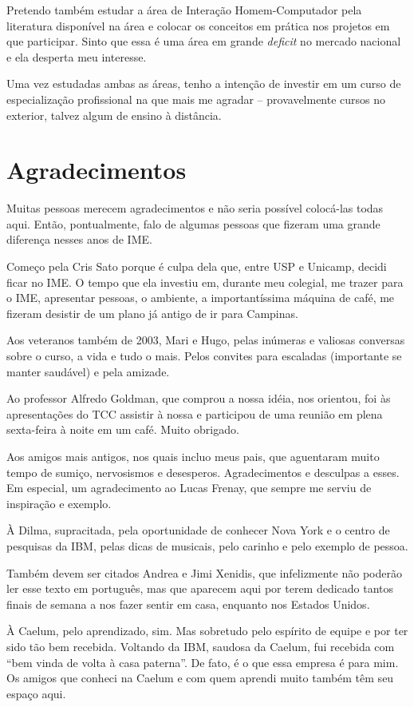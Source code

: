 \documentclass[titlepage,a4paper]{article}
\begin{document}
Pretendo também estudar a área de Interação Homem-Computador pela literatura disponível na área e colocar os conceitos em prática nos projetos em que participar. Sinto que essa é uma área em grande \textit{deficit} no mercado nacional e ela desperta meu interesse.

Uma vez estudadas ambas as áreas, tenho a intenção de investir em um curso de especialização profissional na que mais me agradar -- provavelmente cursos no exterior, talvez algum de ensino à distância.

\section{Agradecimentos}

Muitas pessoas merecem agradecimentos e não seria possível colocá-las todas aqui. Então, pontualmente, falo de algumas pessoas que fizeram uma grande diferença nesses anos de IME. 

Começo pela Cris Sato porque é culpa dela que, entre USP e Unicamp, decidi ficar no IME. O tempo que ela investiu em, durante meu colegial, me trazer para o IME, apresentar pessoas, o ambiente, a importantíssima máquina de café, me fizeram desistir de um plano já antigo de ir para Campinas.

Aos veteranos também de 2003, Mari e Hugo, pelas inúmeras e valiosas conversas sobre o curso, a vida e tudo o mais. Pelos convites para escaladas (importante se manter saudável) e pela amizade.

Ao professor Alfredo Goldman, que comprou a nossa idéia, nos orientou, foi às apresentações do TCC assistir à nossa e participou de uma reunião em plena sexta-feira à noite em um café. Muito obrigado.

Aos amigos mais antigos, nos quais incluo meus pais, que aguentaram muito tempo de sumiço, nervosismos e desesperos. Agradecimentos e desculpas a esses. Em especial, um agradecimento ao Lucas Frenay, que sempre me serviu de inspiração e exemplo.

À Dilma, supracitada, pela oportunidade de conhecer Nova York e o centro de pesquisas da IBM, pelas dicas de musicais, pelo carinho e pelo exemplo de pessoa.

Também devem ser citados Andrea e Jimi Xenidis, que infelizmente não poderão ler esse texto em português, mas que aparecem aqui por terem dedicado tantos finais de semana a nos fazer sentir em casa, enquanto nos Estados Unidos.

À Caelum, pelo aprendizado, sim. Mas sobretudo pelo espírito de equipe e por ter sido tão bem recebida. Voltando da IBM, saudosa da Caelum, fui recebida com ``bem vinda de volta à casa paterna''. De fato, é o que essa empresa é para mim. Os amigos que conheci na Caelum e com quem aprendi muito também têm seu espaço aqui.
\end{document}
